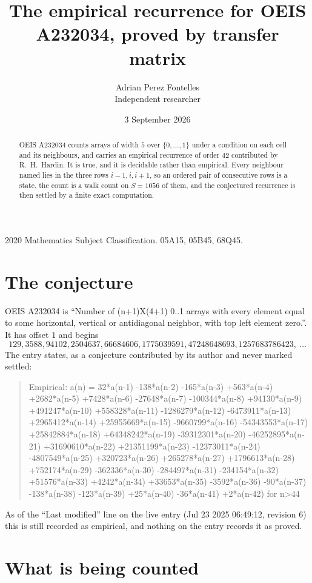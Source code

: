 \documentclass[11pt,a4paper]{article}
\title{The empirical recurrence for OEIS A232034, proved by transfer matrix}
\author{Adrian Perez Fontelles\\ \small Independent researcher}
\date{3 September 2026}
\theoremstyle{plain}
\theoremstyle{definition}
\begin{document}
\maketitle

\begin{abstract}
OEIS A232034 counts arrays of width $5$ over $\{0,\dots,1\}$ under a condition on each cell
and its neighbours, and carries an empirical recurrence of order $42$ contributed by
R.~H.~Hardin. It is true, and it is decidable rather than empirical. Every neighbour named lies
in the three rows $i-1,i,i+1$, so an ordered pair of consecutive rows is a state, the count is
a walk count on $S=1056$ of them, and the conjectured recurrence is then settled by a finite
exact computation.
\end{abstract}

\noindent\small 2020 Mathematics Subject Classification. 05A15, 05B45, 68Q45.\normalsize

\section{The conjecture}

OEIS A232034 is ``Number of (n+1)X(4+1) 0..1 arrays with every element equal to some horizontal, vertical or antidiagonal neighbor, with top left element zero.''. It has offset $1$ and begins
\[
129, 3588, 94102, 2504637, 66684606, 1775039591, 47248648693, 1257683786423,\ \dots
\]
The entry states, as a conjecture contributed by its author and never marked settled:
\begin{quote}
Empirical: a(n) = 32*a(n-1) -138*a(n-2) -165*a(n-3) +563*a(n-4) +2682*a(n-5) +7428*a(n-6) -27648*a(n-7) -100344*a(n-8) +94130*a(n-9) +491247*a(n-10) +558328*a(n-11) -1286279*a(n-12) -6473911*a(n-13) +2965412*a(n-14) +25955669*a(n-15) -9660799*a(n-16) -54343553*a(n-17) +25842884*a(n-18) +64348242*a(n-19) -39312301*a(n-20) -46252895*a(n-21) +31690610*a(n-22) +21351199*a(n-23) -12373011*a(n-24) -4807549*a(n-25) +320723*a(n-26) +265278*a(n-27) +1796613*a(n-28) +752174*a(n-29) -362336*a(n-30) -284497*a(n-31) -234154*a(n-32) +51576*a(n-33) +4242*a(n-34) +33653*a(n-35) -3592*a(n-36) -90*a(n-37) -138*a(n-38) -123*a(n-39) +25*a(n-40) -36*a(n-41) +2*a(n-42) for n>44
\end{quote}
As of the ``Last modified'' line on the live entry (Jul 23 2025 06:49:12, revision 6) this is still
recorded as empirical, and nothing on the entry records it as proved.

\section{What is being counted}
\end{document}

